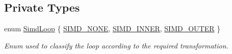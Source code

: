 \subsection*{Private Types}
\begin{DoxyCompactItemize}
\item 
enum \hyperlink{classVectorize_a434b71764ac7af86698c3f2cee6e8a25}{Simd\+Loop} \{ \hyperlink{classVectorize_a434b71764ac7af86698c3f2cee6e8a25a820a006204fea8f1ce2c831eed7972cf}{S\+I\+M\+D\+\_\+\+N\+O\+NE}, 
\hyperlink{classVectorize_a434b71764ac7af86698c3f2cee6e8a25aee07074f050562592ddf7dad47ba2c39}{S\+I\+M\+D\+\_\+\+I\+N\+N\+ER}, 
\hyperlink{classVectorize_a434b71764ac7af86698c3f2cee6e8a25a084e802e3f781dd9e5599a22b403459b}{S\+I\+M\+D\+\_\+\+O\+U\+T\+ER}
 \}\begin{DoxyCompactList}\small\item\em Enum used to classify the loop according to the required transformation. \end{DoxyCompactList}
\end{DoxyCompactItemize}

